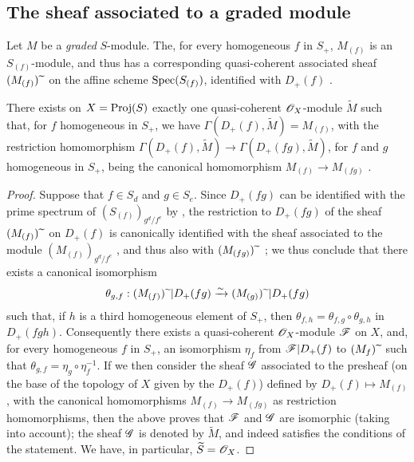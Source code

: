 \subsection{The sheaf associated to a graded module}
\label{subsection:II.2.5}

\begin{env}[2.5.1]
\label{II.2.5.1}
Let $M$ be a \emph{graded} $S$-module.
The, for every homogeneous $f$ in $S_+$, $M_{(f)}$ is an $S_{(f)}$-module, and thus has a corresponding quasi-coherent associated sheaf $(M_{(f)}){\,\widetilde{\,}\,}$ on the affine scheme $\operatorname{Spec}(S_{(f)})$, identified with $D_+(f)$ .
\end{env}

\begin{proposition}[2.5.2]
\label{II.2.5.2}
There exists on $X=\operatorname{Proj}(S)$ exactly one quasi-coherent $\mathscr{O}_X$-module $\widetilde{M}$ such that, for $f$ homogeneous in $S_+$, we have $\Gamma(D_+(f),\widetilde{M})=M_{(f)}$, with the restriction homomorphism $\Gamma(D_+(f),\widetilde{M})\to\Gamma(D_+(fg),\widetilde{M})$, for $f$ and $g$ homogeneous in $S_+$, being the canonical homomorphism $M_{(f)}\to M_{(fg)}$ .
\end{proposition}

\begin{proof}
Suppose that $f\in S_d$ and $g\in S_e$.
Since $D_+(fg)$ can be identified with the prime spectrum of $(S_{(f)})_{g^d/f^e}$ by , the restriction to $D_+(fg)$ of the sheaf $(M_{(f)}){\,\widetilde{\,}\,}$ on $D_+(f)$ is canonically identified with the sheaf associated to the module $(M_{(f)})_{g^d/f^e}$ , and thus also with $(M_{(fg)}){\,\widetilde{\,}\,}$ ;
we thus conclude that there exists a canonical isomorphism
\[
  \theta_{g,f}: (M_{(f)}){\,\widetilde{\,}\,}|D_+(fg) \xrightarrow{\sim} (M_{(g)}){\,\widetilde{\,}\,}|D_+(fg)
\]
such that, if $h$ is a third homogeneous element of $S_+$, then $\theta_{f,h}=\theta_{f,g}\circ\theta_{g,h}$ in $D_+(fgh)$.
Consequently  there exists a quasi-coherent $\mathscr{O}_X$-module $\mathscr{F}$ on $X$, and, for every homogeneous $f$ in $S_+$, an isomorphism $\eta_f$ from $\mathscr{F}|D_+(f)$ to $(M_{f}){\,\widetilde{\,}\,}$ such that $\theta_{g,f}=\eta_g\circ\eta_f^{-1}$.
If we then consider the sheaf $\mathscr{G}$ associated to the presheaf (on the base of the topology of $X$ given by the $D_+(f)$) defined by $D_+(f)\mapsto M_{(f)}$, with the canonical homomorphisms $M_{(f)}\to M_{(fg)}$ as restriction homomorphisms, then the above proves that $\mathscr{F}$ and $\mathscr{G}$ are isomorphic (taking  into account);
the sheaf $\mathscr{G}$ is denoted by $\widetilde{M}$, and indeed satisfies the conditions of the statement.
We have, in particular, $\widetilde{S}=\mathscr{O}_X$.
\end{proof}

